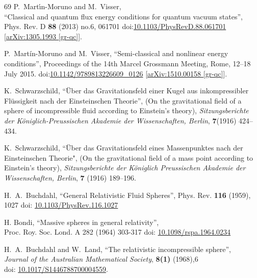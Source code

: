 \documentclass[12pt]{article}
\begin{document}
\begin{thebibliography}{69}
{}
P.~Mart\'\i{}n-Moruno and M.~Visser,\\
``Classical and quantum flux energy conditions for quantum vacuum states'',\\
Phys. Rev. D \textbf{88} (2013) no.6, 061701
doi:\href{https://doi.org/10.1103/PhysRevD.88.061701}{10.1103/PhysRevD.88.061701}
[\href{https://www.arxiv.org/abs/1305.1993}{arXiv:1305.1993 [gr-qc]}].

P.~Mart\'in-Moruno and M.~Visser,
``Semi-classical and nonlinear energy conditions'',
Proceedings of the 14th Marcel Grossmann Meeting, Rome, 12--18 July 2015.
doi:\href{https://doi.org/10.1142/9789813226609_0126}{10.1142/9789813226609\_0126}
[\href{https://www.arxiv.org/abs/1510.00158}{arXiv:1510.00158 [gr-qc]}].


K.~Schwarzschild,
``\"Uber das Gravitationsfeld einer Kugel aus inkompressibler Fl\"ussigkeit nach der Einsteinschen Theorie'', (On the gravitational field of a sphere of incompressible fluid according to Einstein's theory),
\textit{Sitzungsberichte der K\"oniglich-Preussischen Akademie der Wissenschaften, Berlin}, {\bf7}(1916) 424--434.

K.~Schwarzschild, ``\"Uber das Gravitationsfeld eines Massenpunktes nach der Einsteinschen Theorie", (On the gravitational field of a mass point according to Einstein's theory),
\textit{Sitzungsberichte der K\"oniglich Preussischen Akademie der Wissenschaften, Berlin}, {\bf7} (1916) 189--196. 

H.~A.~Buchdahl,
``General Relativistic Fluid Spheres'',
Phys. Rev. \textbf{116} (1959), 1027
doi: \href{https://doi.org/10.1103/PhysRev.116.1027}{10.1103/PhysRev.116.1027}

H. Bondi, ``Massive spheres in general relativity'', \\
Proc. Roy. Soc. Lond. A 282 (1964) 303-317
doi: \href{https://doi.org/10.1098/rspa.1964.0234}{10.1098/rspa.1964.0234}



H.~A.~Buchdahl and W.~Land,
``The relativistic incompressible sphere'',\\
\textit{Journal of the Australian Mathematical Society}, \textbf{8(1)} (1968),6 \\
doi: \href{https://doi.org/10.1017/S1446788700004559}{10.1017/S1446788700004559}.


\end{thebibliography}
\end{document}
